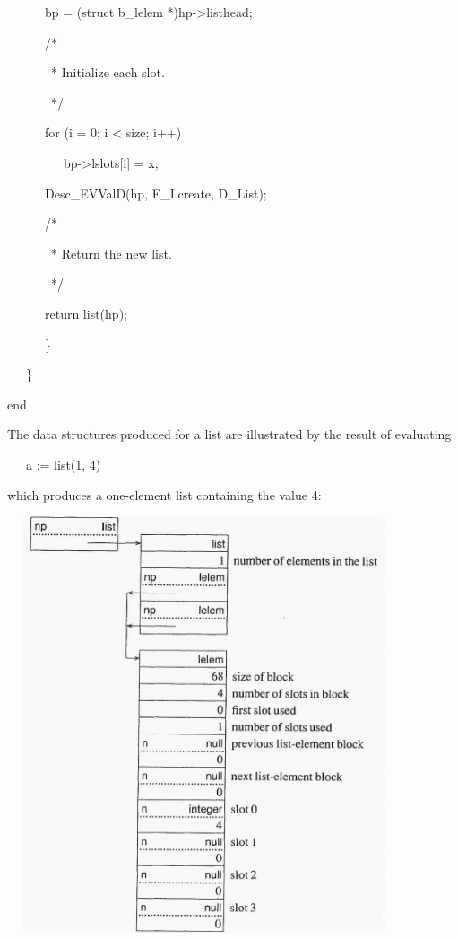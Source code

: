 {\ttfamily\mdseries
\ \ \ \ \ \ bp = (struct b\_lelem *)hp-{\textgreater}listhead;}


\bigskip

{\ttfamily\mdseries
\ \ \ \ \ \ /*}

{\ttfamily\mdseries
\ \ \ \ \ \ \ * Initialize each slot.}

{\ttfamily\mdseries
\ \ \ \ \ \ \ */}

{\ttfamily\mdseries
\ \ \ \ \ \ for (i = 0; i {\textless} size; i++)}

{\ttfamily\mdseries
\ \ \ \ \ \ \ \ \ bp-{\textgreater}lslots[i] = x;}


\bigskip

{\ttfamily\mdseries
\ \ \ \ \ \ Desc\_EVValD(hp, E\_Lcreate, D\_List);}


\bigskip

{\ttfamily\mdseries
\ \ \ \ \ \ /*}

{\ttfamily\mdseries
\ \ \ \ \ \ \ * Return the new list.}

{\ttfamily\mdseries
\ \ \ \ \ \ \ */}

{\ttfamily\mdseries
\ \ \ \ \ \ return list(hp);}

{\ttfamily\mdseries
\ \ \ \ \ \ \}}

{\ttfamily\mdseries
\ \ \ \}}

{\ttfamily\mdseries
end}

The data structures produced for a list are illustrated by the result
of evaluating

{\ttfamily\mdseries
\ \ \ a := list(1, 4)}

\noindent which produces a one-element list containing the value 4:


\bigskip


\ \  \includegraphics[width=4.2752in,height=4.8362in]{ib-img/ib-img027.jpg} 


